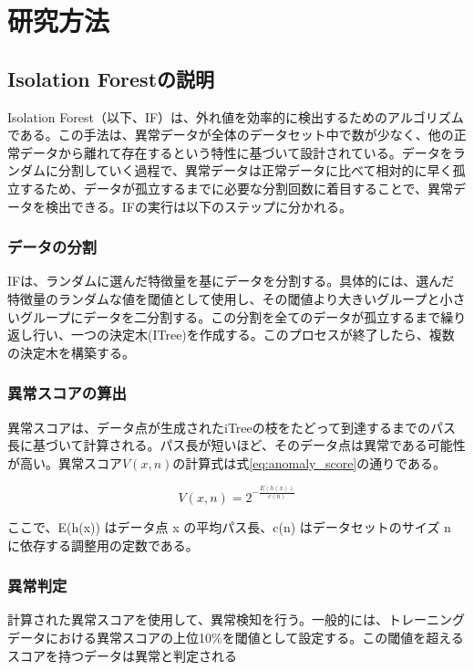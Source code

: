 \documentclass{css}
\begin{document}
\section{研究方法}

\subsection{Isolation Forestの説明}

Isolation Forest（以下、IF）は、外れ値を効率的に検出するためのアルゴリズムである。この手法は、異常データが全体のデータセット中で数が少なく、他の正常データから離れて存在するという特性に基づいて設計されている。データをランダムに分割していく過程で、異常データは正常データに比べて相対的に早く孤立するため、データが孤立するまでに必要な分割回数に着目することで、異常データを検出できる。IFの実行は以下のステップに分かれる。

\subsubsection{データの分割}

IFは、ランダムに選んだ特徴量を基にデータを分割する。具体的には、選んだ特徴量のランダムな値を閾値として使用し、その閾値より大きいグループと小さいグループにデータを二分割する。この分割を全てのデータが孤立するまで繰り返し行い、一つの決定木(ITree)を作成する。このプロセスが終了したら、複数の決定木を構築する。

\subsubsection{異常スコアの算出}

異常スコアは、データ点が生成されたiTreeの枝をたどって到達するまでのパス長に基づいて計算される。パス長が短いほど、そのデータ点は異常である可能性が高い。異常スコア$V(x,n)$の計算式は式\ref{eq:anomaly_score}の通りである。


\begin{equation}
    V(x, n) = 2^{-\frac{E(h(x))}{c(n)}}
    \label{eq:anomaly_score}
\end{equation}


ここで、E(h(x)) はデータ点 x の平均パス長、c(n) はデータセットのサイズ n に依存する調整用の定数である。

\subsubsection{異常判定}

計算された異常スコアを使用して、異常検知を行う。一般的には、トレーニングデータにおける異常スコアの上位10\%を閾値として設定する。この閾値を超えるスコアを持つデータは異常と判定される
\end{document}
